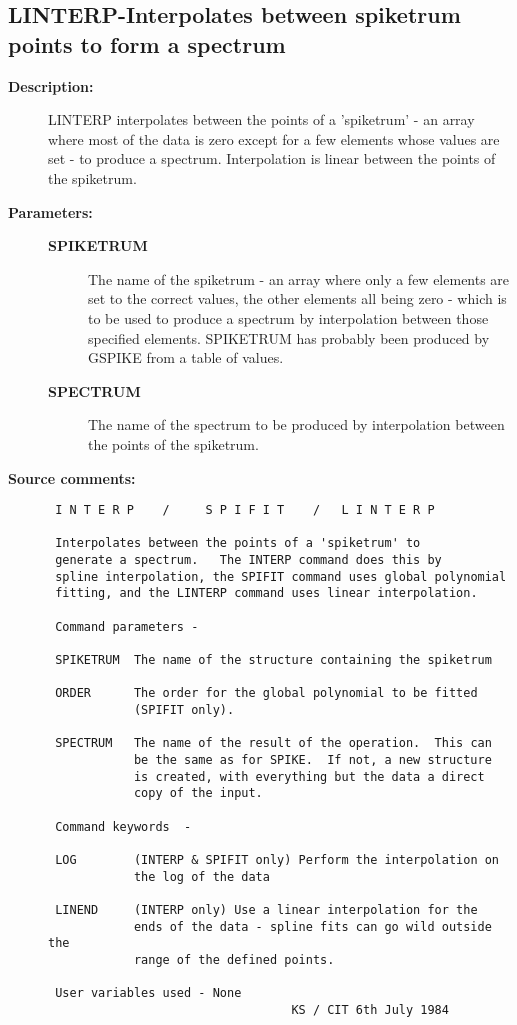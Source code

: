 \subsection{LINTERP-\label{LINTERP}Interpolates between spiketrum points to form a spectrum}
\begin{description}

\item [{\bf Description:}]
 LINTERP interpolates between the points of a 'spiketrum' - an
 array where most of the data is zero except for a few elements
 whose values are set - to produce a spectrum.  Interpolation is
 linear between the points of the spiketrum.

\item [{\bf Parameters:}]
\begin{description}
\item [{\bf SPIKETRUM}]
 The name of the spiketrum - an array where only a
 few elements are set to the correct values, the other
 elements all being zero - which is to be used to produce
 a spectrum by interpolation between those specified
 elements.  SPIKETRUM has probably been produced by
 GSPIKE from a table of values.
\item [{\bf SPECTRUM}]
 The name of the spectrum to be produced by
 interpolation between the points of the spiketrum.
\end{description}

\item [{\bf Source comments:}]
\begin{verbatim}
 I N T E R P    /     S P I F I T    /   L I N T E R P

 Interpolates between the points of a 'spiketrum' to
 generate a spectrum.   The INTERP command does this by
 spline interpolation, the SPIFIT command uses global polynomial
 fitting, and the LINTERP command uses linear interpolation.

 Command parameters -

 SPIKETRUM  The name of the structure containing the spiketrum

 ORDER      The order for the global polynomial to be fitted
            (SPIFIT only).

 SPECTRUM   The name of the result of the operation.  This can
            be the same as for SPIKE.  If not, a new structure
            is created, with everything but the data a direct
            copy of the input.

 Command keywords  -

 LOG        (INTERP & SPIFIT only) Perform the interpolation on
            the log of the data

 LINEND     (INTERP only) Use a linear interpolation for the
            ends of the data - spline fits can go wild outside the
            range of the defined points.

 User variables used - None
                                  KS / CIT 6th July 1984

\end{verbatim}
\end{description}
